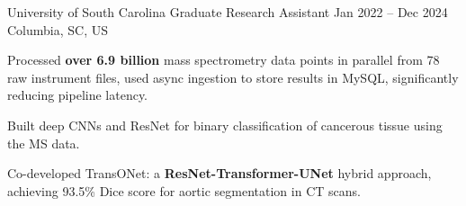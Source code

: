 \begin{cventries}
\cventry
    {University of South Carolina}
    {Graduate Research Assistant}
    {Jan 2022 -- Dec 2024}
    {Columbia, SC, US}
    {
        \begin{cvitemsfree}
            \item{Processed \textbf{over 6.9 billion} mass spectrometry data points in parallel from 78 raw instrument files, used async ingestion to store results in MySQL, significantly reducing pipeline latency.}
            \item{Built deep CNNs and ResNet for binary classification of cancerous tissue using the MS data.}
            \item{Co-developed TransONet: a \textbf{ResNet-Transformer-UNet} hybrid approach, achieving 93.5\% Dice score for aortic segmentation in CT scans.}
        \end{cvitemsfree}
    }

\vspace*{0.2cm}


\end{cventries}
